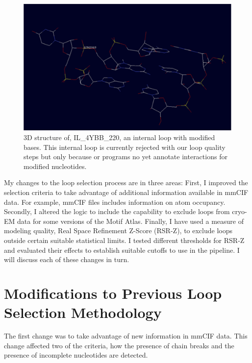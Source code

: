 \begin{figure}
  \includegraphics[width=\textwidth]{chapter-5/figs/loops/IL-4YBB-220}
  \caption{3D structure of, IL\_4YBB\_220, an internal loop with modified bases.
  This internal loop is currently rejected with our loop quality steps but only
  because or programs no yet annotate interactions for modified nucleotides.}
  \label{fig:modified-loop}
\end{figure}

My changes to the loop selection process are in three areas: First, I improved
the selection criteria to take advantage of additional information available in
mmCIF data. For example, mmCIF files includes information on atom occupancy.
Secondly, I altered the logic to include the capability to exclude loops from
cryo-EM data for some versions of the Motif Atlas. Finally, I have used a
measure of modeling quality, Real Space Refinement Z-Score (RSR-Z), to exclude
loops outside certain suitable statistical limits. I tested different thresholds for
RSR-Z and evaluated their effects to establish suitable cutoffs to use in the
pipeline. I will discuss each of these changes in turn.

\section{Modifications to Previous Loop Selection Methodology}

The first change was to take advantage of new information in mmCIF data. This
change affected two of the criteria, how the presence of chain breaks and
the presence of incomplete nucleotides are detected.

